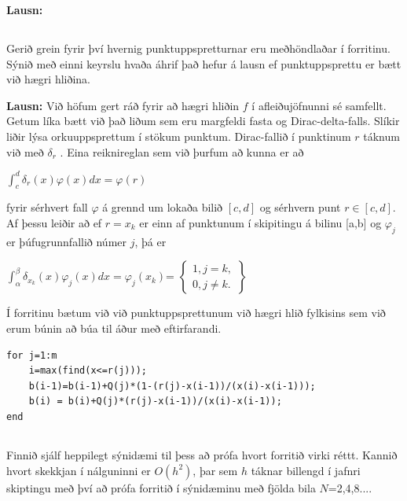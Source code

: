 \documentclass[11pt,a4paper,titlepage]{article}
\begin{document}
\textbf{Lausn:} 

\subsection{}
Gerið grein fyrir því hvernig punktuppspretturnar eru meðhöndlaðar í forritinu. Sýnið með einni keyrslu hvaða áhrif það hefur á lausn ef punktuppsprettu er bætt við hægri hliðina. 

\textbf{Lausn:} 
Við höfum gert ráð fyrir að hægri hliðin $f$ í afleiðujöfnunni sé samfellt. Getum líka bætt við það liðum sem eru margfeldi fasta og Dirac-delta-falls. Slíkir liðir lýsa orkuuppsprettum í stökum punktum.  Dirac-fallið í punktinum $r$ táknum við með $\delta _{r}$ . Eina reiknireglan sem við þurfum að kunna er að 

$\int_{c}^{d}\delta _{r}(x) \varphi (x)dx=\varphi(r)$

fyrir sérhvert fall $\varphi$ á grennd um lokaða bilið $[c,d]$ og sérhvern punt $r\in[c,d]$. Af þessu leiðir að ef $r=x_{k}$ er einn af punktunum í skipitingu á bilinu [a,b] og $\varphi_{j}$ er þúfugrunnfallið númer $j$, þá er 


$\int_{\alpha}^{\beta}\delta_{x}_{k}(x)\varphi_{j}(x)dx = \varphi_{j}(x_{k})$=
$\begin{Bmatrix}
1, j=k,
\\ 
0, j \neq k .
\end{Bmatrix}$

Í forritinu bætum við við punktuppsprettunum við hægri hlið fylkisins sem við erum búnin að búa til áður með eftirfarandi. 
\begin{verbatim}
for j=1:m
    i=max(find(x<=r(j)));
    b(i-1)=b(i-1)+Q(j)*(1-(r(j)-x(i-1))/(x(i)-x(i-1)));
    b(i) = b(i)+Q(j)*(r(j)-x(i-1))/(x(i)-x(i-1));
end
\end{verbatim}
 


\subsection{}
Finnið sjálf heppilegt sýnidæmi til þess að prófa hvort forritið virki réttt. Kannið hvort skekkjan í nálguninni er $O(h^2)$, þar sem $h$ táknar billengd í jafnri skiptingu með því að prófa forritið í sýnidæminu með fjölda bila $N$=2,4,8....
\end{document}
